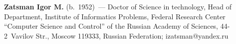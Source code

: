 
  
  \Contrl
  
\noindent
\textbf{Zatsman Igor M.} (b.\ 1952)~--- Doctor of Science in technology, 
Head of Department, Institute of Informatics Problems, Federal Research 
Center ``Computer Science and Control'' of the Russian Academy of 
Sciences, 44-2~Vavilov Str., Moscow 119333, Russian Federation; 
\mbox{izatsman@yandex.ru}
  
\label{end\stat}

\renewcommand{\bibname}{\protect\rm Литература}       

    
    